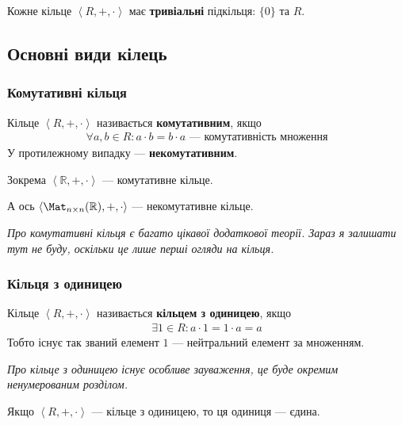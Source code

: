 \documentclass{math_library}
\begin{document}
\begin{remark}
Кожне кільце $\left<R,+,\cdot \right>$ має \textbf{тривіальні} підкільця: $\{0\}$ та $R$.
\end{remark}

\subsection{Основні види кілець}
\subsubsection{Комутативні кільця}
\begin{definition}
Кільце $\left<R,+, \cdot \right>$ називається \textbf{комутативним}, якщо
\begin{align*}
\forall a,b \in R: a \cdot b = b \cdot a \text{ --- комутативність множення}
\end{align*}
У протилежному випадку --- \textbf{некомутативним}.
\end{definition}

\begin{example}
Зокрема $\left<\mathbb{R},+,\cdot \right>$ --- комутативне кільце.
\end{example}

\begin{example}
А ось $\left< \Mat_{n \times n}(\mathbb{R}), +, \cdot \right>$ --- некомутативне кільце.
\end{example}

\textit{Про комутативні кільця є багато цікавої додаткової теорії. Зараз я залишати тут не буду, оскільки це лише перші огляди на кільця.}

\subsubsection{Кільця з одиницею}
\begin{definition}
Кільце $\left<R,+, \cdot \right>$ називається \textbf{кільцем з одиницею}, якщо
\begin{align*}
\exists 1 \in R: a \cdot 1 = 1 \cdot a = a
\end{align*}
Тобто існує так званий елемент $1$ --- нейтральний елемент за множенням.
\end{definition}

\textit{Про кільце з одиницею існує особливе зауваження, це буде окремим ненумерованим розділом.}

\begin{proposition}
Якщо $\left<R,+, \cdot \right>$ --- кільце з одиницею, то ця одиниця --- єдина.
\end{proposition}
\end{document}
